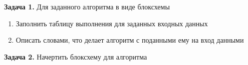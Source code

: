 \documentclass[a4paper,10pt]{article}
\begin{document}
 


\textbf{Задача 1.} Для заданного алгоритма в виде блоксхемы
\begin{enumerate}
 \item Заполнить таблицу выполнения для заданных входных данных
 \item Описать словами, что делает алгоритм с поданными ему на вход данными
\end{enumerate}




\newpage
\textbf{Задача 2.} Начертить блоксхему для алгоритма


\vspace{\fill}
\newpage
\end{document}
